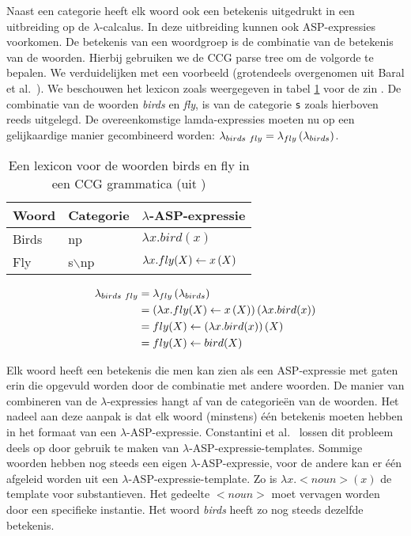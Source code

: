 Naast een categorie heeft elk woord ook een betekenis uitgedrukt in een uitbreiding op de $\lambda$-calcalus. In deze uitbreiding kunnen ook ASP-expressies voorkomen. De betekenis van een woordgroep is de combinatie van de betekenis van de woorden. Hierbij gebruiken we de CCG parse tree om de volgorde te bepalen. We verduidelijken met een voorbeeld (grotendeels overgenomen uit Baral et al.\ \cite{Baral2008}). We beschouwen het lexicon zoals weergegeven in tabel \ref{table:CCG} voor de zin . De combinatie van de woorden \textit{birds} en \textit{fly}, is van de categorie \texttt{s} zoals hierboven reeds uitgelegd. De overeenkomstige lamda-expressies moeten nu op een gelijkaardige manier gecombineerd worden: $\lambda_{birds\ fly}=\app{\lambda_{fly}}{\lambda_{birds}}$.

\begin{table}
  \centering
  \begin{tabular}{|l|l|l|}
    \hline
    Woord & Categorie & $\lambda$-ASP-expressie \\
    \hline
    \hline
    Birds & np & $\lambda x.bird(x)$ \\
    Fly & s$\backslash$np & $\lambda x.fly(X) \leftarrow x \left( X \right)$ \\
    \hline
  \end{tabular}
  \caption{Een lexicon voor de woorden birds en fly in een CCG grammatica (uit \cite{Baral2008})}
  \label{table:CCG}
\end{table}

\begin{equation}
  \label{eq:lambda}
  \begin{aligned}
  \lambda_{birds\ fly} &= \lambda_{fly} \left( \lambda_{birds} \right) \\
          &= (\lambda x.fly(X) \leftarrow x \left( X \right)) \left( \lambda x.bird(x) \right) \\
          &= fly(X) \leftarrow (\lambda x.bird(x)) \left( X \right) \\
          &= fly(X) \leftarrow bird(X)
  \end{aligned}
\end{equation}

Elk woord heeft een betekenis die men kan zien als een ASP-expressie met gaten erin die opgevuld worden door de combinatie met andere woorden. De manier van combineren van de $\lambda$-expressies hangt af van de categorie\"en van de woorden. Het nadeel aan deze aanpak is dat elk woord (minstens) \'e\'en betekenis moeten hebben in het formaat van een $\lambda$-ASP-expressie. Constantini et al.\ \cite{Costantini2010} lossen dit probleem deels op door gebruik te maken van $\lambda$-ASP-expressie-templates. Sommige woorden hebben nog steeds een eigen $\lambda$-ASP-expressie, voor de andere kan er \'e\'en afgeleid worden uit een $\lambda$-ASP-expressie-template. Zo is $\lambda x. <noun>(x)$ de template voor substantieven. Het gedeelte $<noun>$ moet vervagen worden door een specifieke instantie. Het woord \textit{birds} heeft zo nog steeds dezelfde betekenis.

